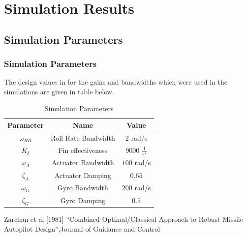 \documentclass[10pt]{beamer}
\begin{document}
\section{Simulation Results}
\subsection{Simulation Parameters}
\begin{frame}
\frametitle{Simulation Parameters}
The design values in \cite{zarchannesline81} for the gains and bandwidths which were used in the simulations are given in table below.
\begin{table}[!t]
\renewcommand{\arraystretch}{1.5}
\caption{Simulation Parameters}
\label{table_rollAP}
\centering
\begin{tabular}{|c||c| |c|}
\hline
Parameter & Name & Value\\
\hline
$\omega_{RR}$ & Roll Rate Bandwidth & $2$ rad/s\\
\hline
$K_\delta$ & Fin effectiveness & $9000$ $\frac{1}{s^2}$\\
\hline
$\omega_A$ & Actuator Bandwidth & $100$ rad/s\\
\hline
$\zeta_A$ & Actuator Damping & $0.65$\\
\hline
$\omega_G$ & Gyro Bandwidth & $200$ rad/s\\
\hline
$\zeta_G$ & Gyro Damping & $0.5$\\
\hline
\end{tabular}
\end{table}
\vspace{.5cm}
\footnoterule
\tiny {\cite{zarchannesline81} Zarchan et al [1981] ``Combined Optimal/Classical Approach to Robust Missile Autopilot Design'',Journal of Guidance and Control}
\end{frame}
\end{document}
